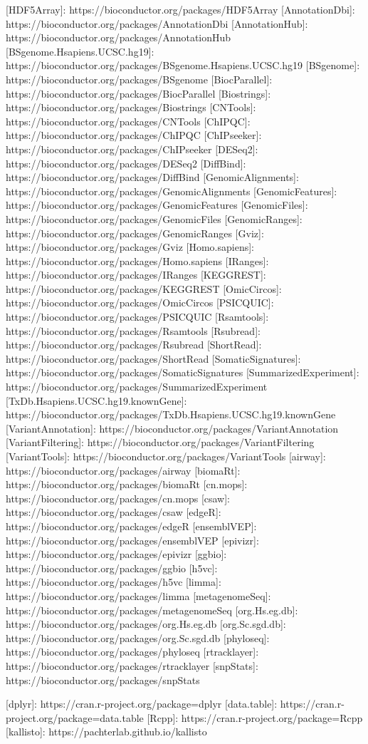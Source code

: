 [HDF5Array]: https://bioconductor.org/packages/HDF5Array
[AnnotationDbi]: https://bioconductor.org/packages/AnnotationDbi
[AnnotationHub]: https://bioconductor.org/packages/AnnotationHub
[BSgenome.Hsapiens.UCSC.hg19]: https://bioconductor.org/packages/BSgenome.Hsapiens.UCSC.hg19
[BSgenome]: https://bioconductor.org/packages/BSgenome
[BiocParallel]: https://bioconductor.org/packages/BiocParallel
[Biostrings]: https://bioconductor.org/packages/Biostrings
[CNTools]: https://bioconductor.org/packages/CNTools
[ChIPQC]: https://bioconductor.org/packages/ChIPQC
[ChIPseeker]: https://bioconductor.org/packages/ChIPseeker
[DESeq2]: https://bioconductor.org/packages/DESeq2
[DiffBind]: https://bioconductor.org/packages/DiffBind
[GenomicAlignments]: https://bioconductor.org/packages/GenomicAlignments
[GenomicFeatures]: https://bioconductor.org/packages/GenomicFeatures
[GenomicFiles]: https://bioconductor.org/packages/GenomicFiles
[GenomicRanges]: https://bioconductor.org/packages/GenomicRanges
[Gviz]: https://bioconductor.org/packages/Gviz
[Homo.sapiens]: https://bioconductor.org/packages/Homo.sapiens
[IRanges]: https://bioconductor.org/packages/IRanges
[KEGGREST]: https://bioconductor.org/packages/KEGGREST
[OmicCircos]: https://bioconductor.org/packages/OmicCircos
[PSICQUIC]: https://bioconductor.org/packages/PSICQUIC
[Rsamtools]: https://bioconductor.org/packages/Rsamtools
[Rsubread]: https://bioconductor.org/packages/Rsubread
[ShortRead]: https://bioconductor.org/packages/ShortRead
[SomaticSignatures]: https://bioconductor.org/packages/SomaticSignatures
[SummarizedExperiment]: https://bioconductor.org/packages/SummarizedExperiment
[TxDb.Hsapiens.UCSC.hg19.knownGene]: https://bioconductor.org/packages/TxDb.Hsapiens.UCSC.hg19.knownGene
[VariantAnnotation]: https://bioconductor.org/packages/VariantAnnotation
[VariantFiltering]: https://bioconductor.org/packages/VariantFiltering
[VariantTools]: https://bioconductor.org/packages/VariantTools
[airway]: https://bioconductor.org/packages/airway
[biomaRt]: https://bioconductor.org/packages/biomaRt
[cn.mops]: https://bioconductor.org/packages/cn.mops
[csaw]: https://bioconductor.org/packages/csaw
[edgeR]: https://bioconductor.org/packages/edgeR
[ensemblVEP]: https://bioconductor.org/packages/ensemblVEP
[epivizr]: https://bioconductor.org/packages/epivizr
[ggbio]: https://bioconductor.org/packages/ggbio
[h5vc]: https://bioconductor.org/packages/h5vc
[limma]: https://bioconductor.org/packages/limma
[metagenomeSeq]: https://bioconductor.org/packages/metagenomeSeq
[org.Hs.eg.db]: https://bioconductor.org/packages/org.Hs.eg.db
[org.Sc.sgd.db]: https://bioconductor.org/packages/org.Sc.sgd.db
[phyloseq]: https://bioconductor.org/packages/phyloseq
[rtracklayer]: https://bioconductor.org/packages/rtracklayer
[snpStats]: https://bioconductor.org/packages/snpStats

[dplyr]: https://cran.r-project.org/package=dplyr
[data.table]: https://cran.r-project.org/package=data.table
[Rcpp]: https://cran.r-project.org/package=Rcpp
[kallisto]: https://pachterlab.github.io/kallisto
